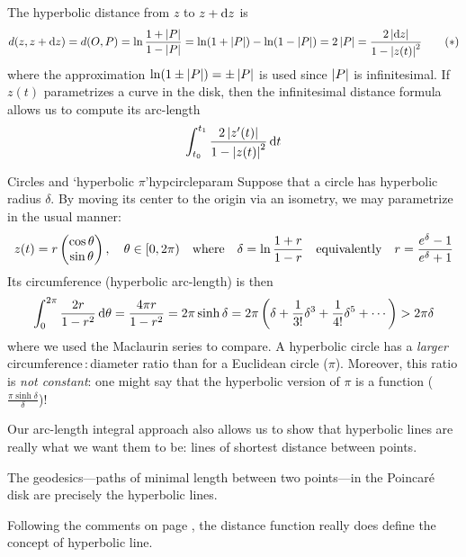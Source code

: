 The hyperbolic distance from $z$ to $z+{\mathrm{d} z}$ is
\[
	d(z,z+{\mathrm{d} z})=d(O,P)=\ln\frac{1+\left| P\right|}{1-\left| P\right|} =\ln(1+\left| P\right|)-\ln(1-\left| P\right|)=2\left| P\right|=\frac{2\left| {\mathrm{d} z}\right|}{1-\left| z(t)\right|^2} \tag{$\ast$}
\]
where the approximation $\ln(1\pm\left| P\right|)=\pm\left| P\right|$ is used since $\left| P\right|$ is infinitesimal. If $z(t)$ parametrizes a curve in the disk, then the infinitesimal distance formula allows us to compute its arc-length
\[
	\int_{t_0}^{t_1}\frac{2\left| z'(t)\right|}{1-\left| z(t)\right|^2}\,{\mathrm{d} t}
\]

	
\begin{example}{Circles and `hyperbolic $\pi$'}{hypcircleparam}
	Suppose that a circle has hyperbolic radius $\delta$. By moving its center to the origin via an isometry, we may parametrize in the usual manner:
	\[
		z(t)=r\begin{pmatrix}\cos\theta\\\sin\theta\end{pmatrix},\quad \theta\in[0,2\pi)
		\quad\text{where}\quad 
		\delta=\ln\frac{1+r}{1-r}
		\quad\text{equivalently}\quad
		r=\frac{e^\delta-1}{e^\delta+1}
	\]
	Its circumference (hyperbolic arc-length) is then
	\[
		\int_0^{2\pi}\frac{2 r}{1-r^2}\,{\mathrm{d}\theta} =\frac{4\pi r}{1-r^2} =2\pi\sinh\delta =2\pi\left(\delta+\frac{1}{3!}\delta^3+\frac{1}{4!}\delta^5+\cdots\right)>2\pi\delta
	\]
	where we used the Maclaurin series to compare.\smallbreak
	A hyperbolic circle has a \emph{larger} circumference\,:\,diameter ratio than for a Euclidean circle ($\pi$). Moreover, this ratio is \emph{not constant}: one might say that the hyperbolic version of $\pi$ is a function ($\frac{\pi\sinh\delta}\delta$)!
\end{example}

\goodbreak
	
Our arc-length integral approach also allows us to show that hyperbolic lines are really what we want them to be: lines of shortest distance between points.
	
\begin{thm}{}{}
	The geodesics---paths of minimal length between two points---in the Poincaré disk are precisely the hyperbolic lines.
\end{thm}

Following the comments on page \pageref{sec:hyperiso}, the distance function really does define the concept of hyperbolic line.

